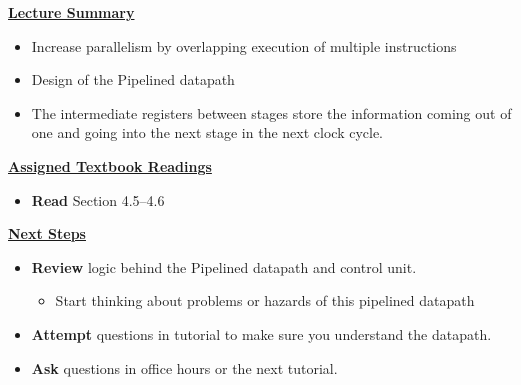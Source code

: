\begin{frame}[fragile]
 \underline{\textbf{Lecture Summary}}
 \begin{itemize}
 \item Increase parallelism by overlapping execution of multiple instructions 
\item Design of the Pipelined datapath
\item  The intermediate registers between stages store the information coming out of one and going into the next stage in the next clock cycle.
\end{itemize}
 \underline{\textbf{Assigned Textbook Readings}}
\begin{itemize}
     \item \textbf{Read} Section 4.5--4.6 %
     \end{itemize}
    \underline{\textbf{Next Steps}}
    \begin{itemize}
     \item \textbf{Review} logic behind the Pipelined datapath and control unit. 
\begin{itemize}
    \item Start thinking about problems or hazards of this pipelined datapath
\end{itemize}
\item \textbf{Attempt} questions in tutorial to make sure you understand the datapath. 
    \item \textbf{Ask} questions in office hours or the next tutorial.
 \end{itemize}

\end{frame}


